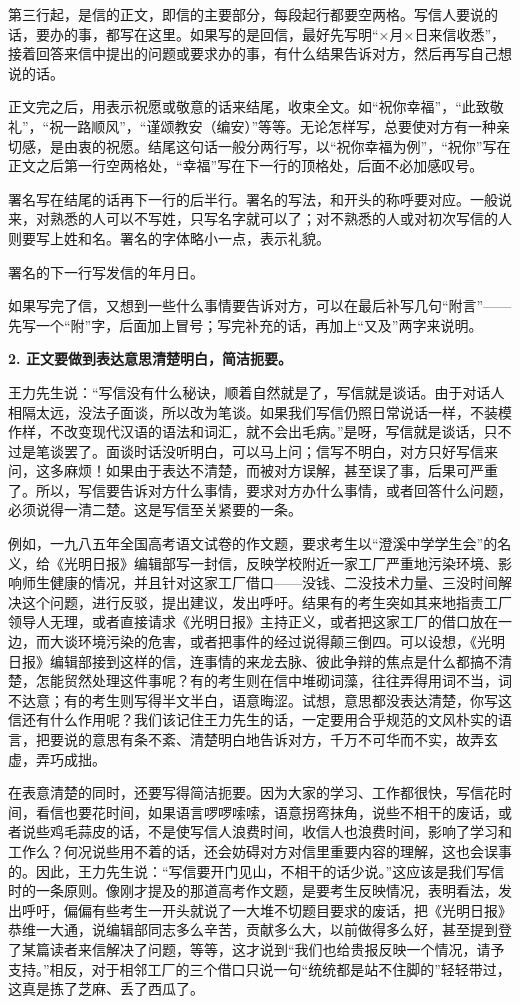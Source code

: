 第三行起，是信的正文，即信的主要部分，每段起行都要空两格。写信人要说的话，要办的事，都写在这里。如果写的是回信，最好先写明“×月×日来信收悉”，接着回答来信中提出的问题或要求办的事，有什么结果告诉对方，然后再写自己想说的话。

正文完之后，用表示祝愿或敬意的话来结尾，收束全文。如“祝你幸福”，“此致敬礼”，“祝一路顺风”，“谨颂教安（编安）”等等。无论怎样写，总要使对方有一种亲切感，是由衷的祝愿。结尾这句话一般分两行写，以“祝你幸福为例”，“祝你”写在正文之后第一行空两格处，“幸福”写在下一行的顶格处，后面不必加感叹号。

署名写在结尾的话再下一行的后半行。署名的写法，和开头的称呼要对应。一般说来，对熟悉的人可以不写姓，只写名字就可以了；对不熟悉的人或对初次写信的人则要写上姓和名。署名的字体略小一点，表示礼貌。

署名的下一行写发信的年月日。

如果写完了信，又想到一些什么事情要告诉对方，可以在最后补写几句“附言”——先写一个“附”字，后面加上冒号；写完补充的话，再加上“又及”两字来说明。

\textbf{2. 正文要做到表达意思清楚明白，简洁扼要。}

王力先生说：“写信没有什么秘诀，顺着自然就是了，写信就是谈话。由于对话人相隔太远，没法子面谈，所以改为笔谈。如果我们写信仍照日常说话一样，不装模作样，不改变现代汉语的语法和词汇，就不会出毛病。”是呀，写信就是谈话，只不过是笔谈罢了。面谈时话没听明白，可以马上问；信写不明白，对方只好写信来问，这多麻烦！如果由于表达不清楚，而被对方误解，甚至误了事，后果可严重了。所以，写信要告诉对方什么事情，要求对方办什么事情，或者回答什么问题，必须说得一清二楚。这是写信至关紧要的一条。

例如，一九八五年全国高考语文试卷的作文题，要求考生以“澄溪中学学生会”的名义，给《光明日报》编辑部写一封信，反映学校附近一家工厂严重地污染环境、影响师生健康的情况，并且针对这家工厂借口——没钱、二没技术力量、三没时间解决这个问题，进行反驳，提出建议，发出呼吁。结果有的考生突如其来地指责工厂领导人无理，或者直接请求《光明日报》主持正义，或者把这家工厂的借口放在一边，而大谈环境污染的危害，或者把事件的经过说得颠三倒四。可以设想，《光明日报》编辑部接到这样的信，连事情的来龙去脉、彼此争辩的焦点是什么都搞不清楚，怎能贸然处理这件事呢？有的考生则在信中堆砌词藻，往往弄得用词不当，词不达意；有的考生则写得半文半白，语意晦涩。试想，意思都没表达清楚，你写这信还有什么作用呢？我们该记住王力先生的话，一定要用合乎规范的文风朴实的语言，把要说的意思有条不紊、清楚明白地告诉对方，千万不可华而不实，故弄玄虚，弄巧成拙。

在表意清楚的同时，还要写得简洁扼要。因为大家的学习、工作都很快，写信花时间，看信也要花时间，如果语言啰啰嗦嗦，语意拐弯抹角，说些不相干的废话，或者说些鸡毛蒜皮的话，不是使写信人浪费时间，收信人也浪费时间，影响了学习和工作么？何况说些用不着的话，还会妨碍对方对信里重要内容的理解，这也会误事的。因此，王力先生说：“写信要开门见山，不相干的话少说。”这应该是我们写信时的一条原则。像刚才提及的那道高考作文题，是要考生反映情况，表明看法，发出呼吁，偏偏有些考生一开头就说了一大堆不切题目要求的废话，把《光明日报》恭维一大通，说编辑部同志多么辛苦，贡献多么大，以前做得多么好，甚至提到登了某篇读者来信解决了问题，等等，这才说到“我们也给贵报反映一个情况，请予支持。”相反，对于相邻工厂的三个借口只说一句“统统都是站不住脚的”轻轻带过，这真是拣了芝麻、丢了西瓜了。

